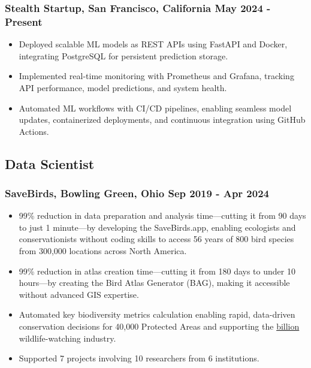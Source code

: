 \documentclass[11pt]{article}
\begin{document}
\subsubsection{Stealth Startup, San Francisco, California \hfill May 2024 - Present}
\begin{itemize}[itemsep=5pt]
	\item Deployed scalable ML models as REST APIs using FastAPI and Docker, integrating PostgreSQL for persistent prediction storage.
	\item Implemented real-time monitoring with Prometheus and Grafana, tracking API performance, model predictions, and system health. 
	\item Automated ML workflows with CI/CD pipelines, enabling seamless model updates, containerized deployments, and continuous integration using GitHub Actions.
\end{itemize}

\subsection{Data Scientist}
\subsubsection{SaveBirds, Bowling Green, Ohio \hfill Sep 2019 - Apr 2024}
\begin{itemize}[itemsep=5pt]
	\item 99\% reduction in data preparation and analysis time—cutting it from 90 days to just 1 minute—by developing the SaveBirds.app, enabling ecologists and conservationists without coding skills to access 56 years of 800 bird species from 300,000 locations across North America.
	\item 99\% reduction in atlas creation time—cutting it from 180 days to under 10 hours—by creating the Bird Atlas Generator (BAG), making it accessible without advanced GIS expertise.
	\item Automated key biodiversity metrics calculation enabling rapid, data-driven conservation decisions for 40,000 Protected Areas and supporting the \href{https://www.usgs.gov/centers/eesc/science/north-american-breeding-bird-survey#:~:text=common\%20and\%20helping-,fuel\%20a\%20\%2475\%20billion\%20wildlife\%20watching\%20industry,-.}{ billion} wildlife-watching industry.
	\item Supported 7 projects involving 10 researchers from 6 institutions.
\end{itemize}
\end{document}
